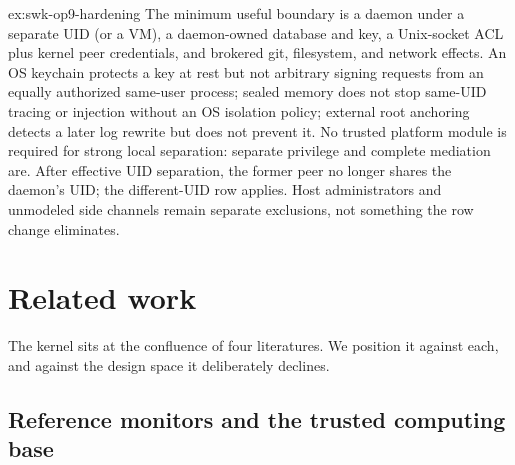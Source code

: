 \documentclass[11pt,a4paper]{article}
\theoremstyle{definition}
\theoremstyle{remark}
\begin{document}
\begin{pdsolution}{ex:swk-op9-hardening}
The minimum useful boundary is a daemon under a separate UID (or a VM), a daemon-owned database and key, a Unix-socket ACL plus kernel peer credentials, and brokered git, filesystem, and network effects. An OS keychain protects a key at rest but not arbitrary signing requests from an equally authorized same-user process; sealed memory does not stop same-UID tracing or injection without an OS isolation policy; external root anchoring detects a later log rewrite but does not prevent it. No trusted platform module is required for strong local separation: separate privilege and complete mediation are. After effective UID separation, the former peer no longer shares the daemon's UID; the different-UID row applies. Host administrators and unmodeled side channels remain separate exclusions, not something the row change eliminates.
\end{pdsolution}

\section{Related work}
\label{sec:related}

The kernel sits at the confluence of four literatures. We position it against each,
and against the design space it deliberately declines.

\subsection{Reference monitors and the trusted computing base}
\end{document}

